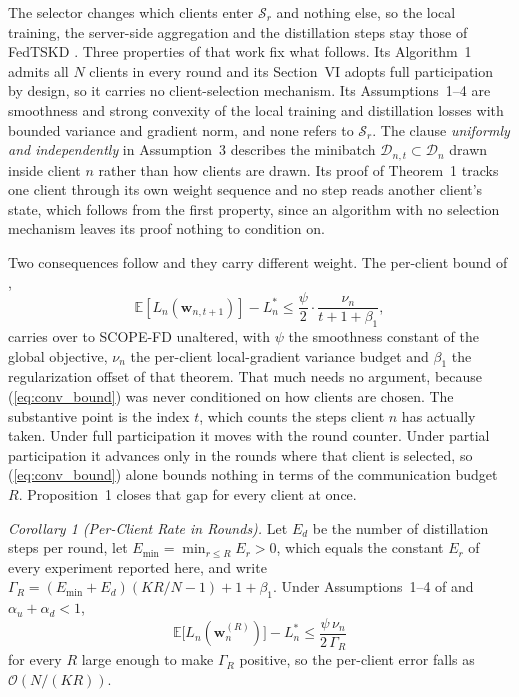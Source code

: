 \documentclass[journal]{IEEEtran}
\newcommand{\rev}[1]{{\color{blue}#1}}
\begin{document}
\rev{The selector changes which clients enter $\mathcal{S}_r$ and nothing else, so the local training, the server-side aggregation and the distillation steps stay those of FedTSKD \cite{mu2024fedtskd}. Three properties of that work fix what follows. Its Algorithm~1 admits all $N$ clients in every round and its Section~VI adopts full participation by design, so it carries no client-selection mechanism. Its Assumptions~1--4 are smoothness and strong convexity of the local training and distillation losses with bounded variance and gradient norm, and none refers to $\mathcal{S}_r$. The clause \emph{uniformly and independently} in Assumption~3 describes the minibatch $\mathcal{D}_{n,t} \subset \mathcal{D}_n$ drawn inside client $n$ rather than how clients are drawn. Its proof of Theorem~1 tracks one client through its own weight sequence and no step reads another client's state, which follows from the first property, since an algorithm with no selection mechanism leaves its proof nothing to condition on.}

\rev{Two consequences follow and they carry different weight. The per-client bound of \cite[Theorem~1]{mu2024fedtskd},}
\begin{equation}
\mathbb{E}\!\left[L_n\!\left(\bm{w}_{n,t+1}\right)\right] - L_n^{*} \le \frac{\psi}{2}\cdot\frac{\nu_n}{t+1+\beta_1},
\label{eq:conv_bound}
\end{equation}
\rev{carries over to SCOPE-FD unaltered, with $\psi$ the smoothness constant of the global objective, $\nu_n$ the per-client local-gradient variance budget and $\beta_1$ the regularization offset of that theorem. That much needs no argument, because (\ref{eq:conv_bound}) was never conditioned on how clients are chosen. The substantive point is the index $t$, which counts the steps client $n$ has actually taken. Under full participation it moves with the round counter. Under partial participation it advances only in the rounds where that client is selected, so (\ref{eq:conv_bound}) alone bounds nothing in terms of the communication budget $R$. Proposition~1 closes that gap for every client at once.}

\rev{\textit{Corollary 1 (Per-Client Rate in Rounds).} Let $E_d$ be the number of distillation steps per round, let $E_{\min} = \min_{r \le R} E_r > 0$, which equals the constant $E_r$ of every experiment reported here, and write $\Gamma_R = (E_{\min}+E_d)\left(KR/N - 1\right) + 1 + \beta_1$. Under Assumptions~1--4 of \cite{mu2024fedtskd} and $\alpha_u + \alpha_d < 1$,}
\begin{equation}
\mathbb{E}\bigl[L_n(\bm{w}_n^{(R)})\bigr] - L_n^{*} \le \frac{\psi\, \nu_n}{2\,\Gamma_R}
\label{eq:cor_perclient}
\end{equation}
\rev{for every $R$ large enough to make $\Gamma_R$ positive, so the per-client error falls as $\mathcal{O}(N/(KR))$.}
\end{document}
